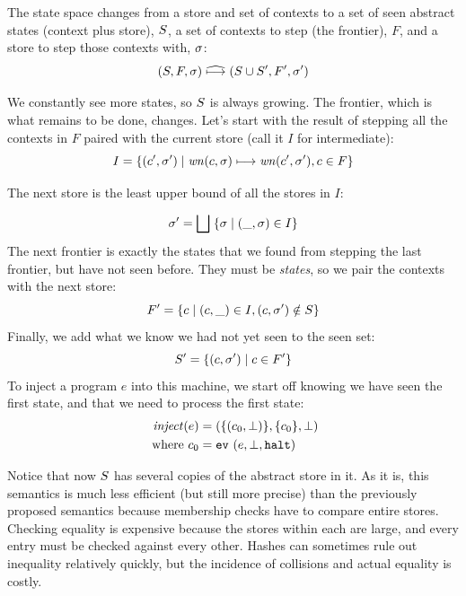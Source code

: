 \documentclass[9pt]{sigplanconf} %
\begin{document}
The state space changes from a store and set of contexts to a set
of seen abstract states (context plus store), $S$, a set of contexts to
step (the frontier), $F$, and a store to step those contexts with, $\sigma$:
\begin{equation*}
(S, F, \sigma) \mathrel{\widehat{\mathbin{\longmapsto}}} (S \cup S', F', \sigma')
\end{equation*}

We constantly see more states, so $S$ is always growing. The frontier,
which is what remains to be done, changes. Let's start with the result
of stepping all the contexts in $F$ paired with the current store (call it $I$ for intermediate):
%
\begin{equation*}
I = \{(c',\sigma') \mid \mathit{wn}(c, \sigma) \mathrel{\mathbin{\longmapsto}} \mathit{wn}(c', \sigma'), c \in F\}
\end{equation*}

The next store is the least upper bound of all the stores in $I$:

\begin{equation*}
\sigma' = \bigsqcup\; \{\sigma \mid (\_,\sigma) \in I\}
\end{equation*}
%
The next frontier is exactly the states that we found from stepping
the last frontier, but have not seen before. They must be
\emph{states}, so we pair the contexts with the next store:
%
\begin{equation*}
F' = \{c \mid (c,\_) \in I, (c,\sigma') \notin S\}
\end{equation*}
%
Finally, we add what we know we had not yet seen to the seen set:
\begin{equation*}
  S' = \{(c,\sigma') \mid c \in F'\}
\end{equation*}
%
To inject a program $e$ into this machine, we start off knowing we
have seen the first state, and that we need to process the first
state:
\begin{align*}
\mathit{inject}(e) &= (\{(c_0, \bot)\},\{c_0\},\bot) \\
\text{ where } c_0 &= {\tt ev}{\ }({e,\bot,{\tt halt}})
\end{align*}

Notice that now $S$ has several copies of the abstract store in it. As
it is, this semantics is much less efficient (but still more precise)
than the previously proposed semantics because membership checks have
to compare entire stores. Checking equality is expensive because the stores within each are
large, and every entry must be checked against every other. Hashes can
sometimes rule out inequality relatively quickly, but the incidence of
collisions and actual equality is costly.
\end{document}
